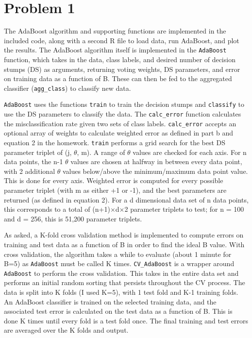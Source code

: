 \documentclass[12pt]{article}%
\begin{document}
\section{Problem 1}
The AdaBoost algorithm and supporting functions are implemented in the included code, along with a second R file to load data, run AdaBoost, and plot the results. The AdaBoost algorithm itself is implemented in the \texttt{AdaBoost} function, which takes in the data, class labels, and desired number of decision stumps (DS) as arguments, returning voting weights, DS parameters, and error on training data as a function of B. These can then be fed to the aggregated classifier (\texttt{agg\_class}) to classify new data. 

\texttt{AdaBoost} uses the functions \texttt{train} to train the decision stumps and \texttt{classify} to use the DS parameters to classify the data. The \texttt{calc\_error} function calculates the misclassification rate given two sets of class labels. \texttt{calc\_error} accepts an optional array of weights to calculate weighted error as defined in part b and equation 2 in the homework. \texttt{train} performs a grid search for the best DS parameter triplet of (j, $\theta$, m). A range of $\theta$ values are checked for each axis. For n data points, the n-1 $\theta$ values are chosen at halfway in between every data point, with 2 additional $\theta$ values below/above the minimum/maximum data point value. This is done for every axis. Weighted error is computed for every possible parameter triplet (with m as either +1 or -1), and the best parameters are returned (as defined in equation 2). For a d dimensional data set of n data points, this corresponds to a total of (n+1)$\times$d$\times$2 parameter triplets to test; for n = 100 and d = 256, this is 51,200 parameter triplets. 

As asked, a K-fold cross validation method is implemented to compute errors on training and test data as a function of B in order to find the ideal B value. With cross validation, the algorithm takes a while to evaluate (about 1 minute for B=5) as \texttt{AdaBoost} must be called K times. \texttt{CV\_AdaBoost} is a wrapper around \texttt{AdaBoost} to perform the cross validation. This takes in the entire data set and performs an initial random sorting that persists throughout the CV process. The data is split into K folds (I used K=5), with 1 test fold and K-1 training folds. An AdaBoost classifier is trained on the selected training data, and the associated test error is calculated on the test data as a function of B. This is done K times until every fold is a test fold once. The final training and test errors are averaged over the K folds and output.
\end{document}
